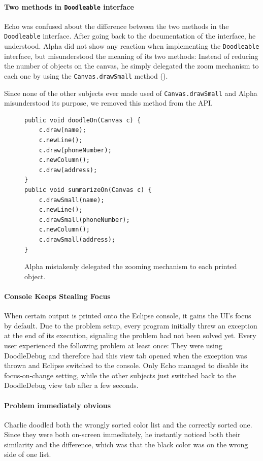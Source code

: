 \documentclass[english]{scrartcl}
\newcommand{\DD}{Dood\-le\-De\-bug\xspace}
\begin{document}
\paragraph{Two methods in \texttt{Doodleable} interface}
Echo was confused about the difference between the two methods in the \texttt{Doodleable} interface. After going back to the documentation of the interface, he understood.
Alpha did not show any reaction when implementing the \texttt{Doodleable} interface, but misunderstood the meaning of its two methods: Instead of reducing the number of objects on the canvas, he simply delegated the zoom mechanism to each one by using the \texttt{Canvas.drawSmall} method ().

Since none of the other subjects ever made used of \texttt{Canvas.drawSmall} and Alpha misunderstood its purpose, we removed this method from the API.

\begin{figure}[h]
\begin{lstlisting}
public void doodleOn(Canvas c) {
	c.draw(name);
	c.newLine();
	c.draw(phoneNumber);
	c.newColumn();
	c.draw(address);
}
public void summarizeOn(Canvas c) {
	c.drawSmall(name);
	c.newLine();
	c.drawSmall(phoneNumber);
	c.newColumn();
	c.drawSmall(address);
}
\end{lstlisting}
  \caption{Alpha mistakenly delegated the zooming mechanism to each printed object.}
\end{figure}

\paragraph{Console Keeps Stealing Focus}
When certain output is printed onto the Eclipse console, it gains the UI's focus by default.
Due to the problem setup, every program initially threw an exception at the end of its execution, signaling the problem had not been solved yet.
Every user experienced the following problem at least once: They were using \DD and therefore had this view tab opened when the exception was thrown and Eclipse switched to the console.
Only Echo managed to disable its focus-on-change setting, while the other subjects just switched back to the \DD view tab after a few seconds.

\paragraph{Problem immediately obvious}
Charlie doodled both the wrongly sorted color list and the correctly sorted one. Since they were both on-screen immediately, he instantly noticed both their similarity and the difference, which was that the black color was on the wrong side of one list.
\end{document}
